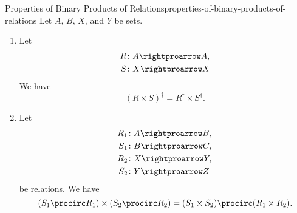 \begin{proposition}{Properties of Binary Products of Relations}{properties-of-binary-products-of-relations}%
    Let $A$, $B$, $X$, and $Y$ be sets.
    \begin{enumerate}
        \item\label{properties-of-binary-products-of-relations-interaction-with-converses}Let
            \begin{align*}
                R &\colon A\rightproarrow A,\\
                S &\colon X\rightproarrow X
            \end{align*}
            We have
            \[
                (R\times S)^{\dagger}
                =
                R^{\dagger}\times S^{\dagger}.
            \]%
        \item\label{properties-of-binary-products-of-relations-interaction-with-composition}Let
            \begin{align*}
                R_{1} &\colon A\rightproarrow B,\\
                S_{1} &\colon B\rightproarrow C,\\
                R_{2} &\colon X\rightproarrow Y,\\
                S_{2} &\colon Y\rightproarrow Z
            \end{align*}
            be relations. We have
            \[
                (S_{1}\procirc R_{1})\times(S_{2}\procirc R_{2})%
                =%
                (S_{1}\times S_{2})\procirc(R_{1}\times R_{2}).%
            \]%
    \end{enumerate}
\end{proposition}
